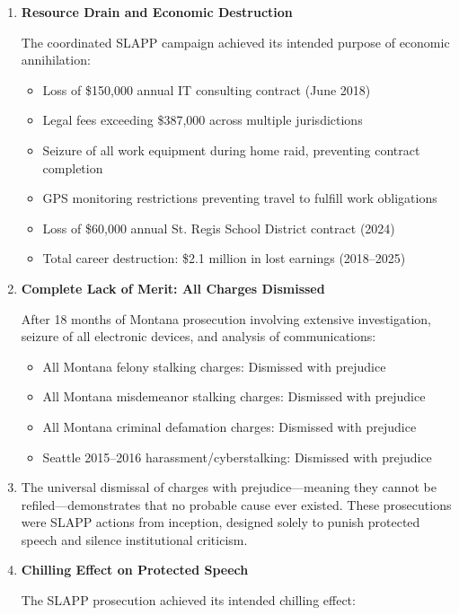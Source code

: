 \documentclass[12pt,letterpaper]{article}
\begin{document}
\begin{enumerate}
\item \textbf{Resource Drain and Economic Destruction}

The coordinated SLAPP campaign achieved its intended purpose of economic annihilation:

\begin{itemize}
\item Loss of \$150,000 annual IT consulting contract (June 2018)
\item Legal fees exceeding \$387,000 across multiple jurisdictions
\item Seizure of all work equipment during home raid, preventing contract completion
\item GPS monitoring restrictions preventing travel to fulfill work obligations
\item Loss of \$60,000 annual St. Regis School District contract (2024)
\item Total career destruction: \$2.1 million in lost earnings (2018--2025)
\end{itemize}

\item \textbf{Complete Lack of Merit: All Charges Dismissed}

After 18 months of Montana prosecution involving extensive investigation, seizure of all electronic devices, and analysis of communications:

\begin{itemize}
\item All Montana felony stalking charges: Dismissed with prejudice
\item All Montana misdemeanor stalking charges: Dismissed with prejudice
\item All Montana criminal defamation charges: Dismissed with prejudice
\item Seattle 2015--2016 harassment/cyberstalking: Dismissed with prejudice
\end{itemize}

\item The universal dismissal of charges with prejudice---meaning they cannot be refiled---demonstrates that no probable cause ever existed. These prosecutions were SLAPP actions from inception, designed solely to punish protected speech and silence institutional criticism.

\item \textbf{Chilling Effect on Protected Speech}

The SLAPP prosecution achieved its intended chilling effect:


\end{enumerate}
\end{document}

